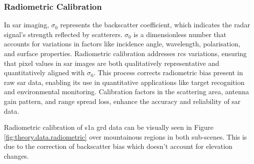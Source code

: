 \subsubsection{Radiometric Calibration}

In \acs{sar} imaging, $\sigma_{0}$ represents the backscatter coefficient, which indicates the radar signal's strength reflected by scatterers. $\sigma_{0}$ is a dimensionless number that accounts for variations in factors like incidence angle, wavelength, polarisation, and surface properties. Radiometric calibration addresses \ac{rcs} variations, ensuring that pixel values in \acs{sar} images are both qualitatively representative and quantitatively aligned with $\sigma_{0}$. This process corrects radiometric bias present in raw \acs{sar} data, enabling its use in quantitative applications like target recognition and environmental monitoring. Calibration factors in the scattering area, antenna gain pattern, and range spread loss, enhance the accuracy and reliability of \acs{sar} data.

Radiometric calibration of \acs{s1a} \acs{grd} data can be visually seen in Figure \ref{fig:theory.data.radiometric} over mountainous regions in both sub-scenes. This is due to the correction of backscatter bias which doesn't account for elevation changes.



